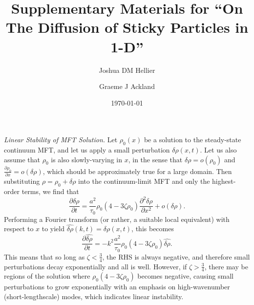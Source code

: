 \documentclass[
reprint,
 amsmath,amssymb,
 aps,
 prl,
]{revtex4-1}
\newcommand{\partDeriv}[2]{\frac{\partial #1}{\partial #2}}
\begin{document}

\title{Supplementary Materials for ``On The Diffusion of Sticky Particles in 1-D''}%

\author{Joshua DM Hellier}
\author{Graeme J Ackland}%
%


\date{\today}%
\maketitle

%



\textit{Linear Stability of MFT Solution.} Let $\rho_0 (x)$ be a solution to the steady-state continuum MFT, and let us apply a small perturbation $\delta \rho(x, t)$. Let us also assume that $\rho_0$ is also slowly-varying in $x$,
in the sense that $\delta \rho = o(\rho_0)$ and $ \partDeriv{\rho_0}{x} = o(\delta \rho)$, which should be approximately true for a large domain.
Then substituting $\rho = \rho_0 + \delta \rho$ into the continuum-limit MFT and only the highest-order terms, we find that
\begin{equation}
 \partDeriv{\delta \rho}{t} =  \frac{a^2}{\tau_0} \rho_0 (4 - 3 \zeta \rho_0) \partDeriv{^2 \delta \rho}{x^2} + o(\delta \rho).
\end{equation}
Performing a  Fourier transform  (or rather, a suitable local equivalent) with respect to $x$ to yield $\hat{\delta \rho}(k, t) = \delta \rho(x, t)$, this becomes
\begin{equation}
 \partDeriv{\hat{\delta \rho}}{t} = -k^2 \frac{a^2}{\tau_0}\rho_0 (4 - 3 \zeta \rho_0)\hat{\delta \rho}.
\end{equation}
This means that so long as $\zeta < \frac{3}{4}$, the RHS is always negative, and therefore small perturbations decay exponentially and all is well. However, if $\zeta>\frac{3}{4}$, there may be regions of the solution where
$\rho_0 (4 - 3 \zeta \rho_0)$ becomes negative, causing small perturbations to grow exponentially with an emphasis on high-wavenumber (short-lengthscale) modes, which indicates linear instability.
\end{document}
